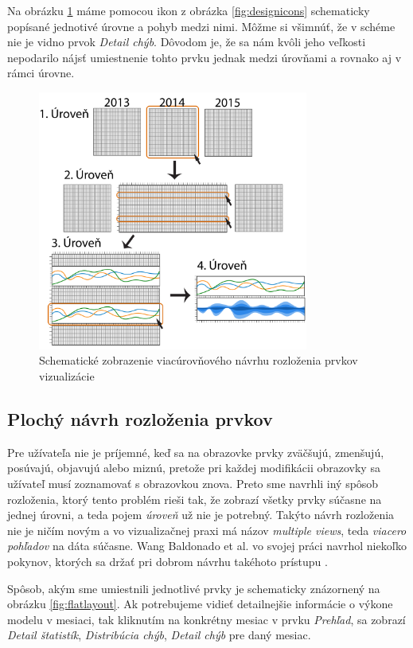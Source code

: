 Na obrázku \ref{fig:multilevellayout} máme pomocou ikon z obrázka \ref{fig:designicons} schematicky popísané jednotivé úrovne a pohyb medzi nimi. Môžme si všimnúť, že v schéme nie je vidno prvok \textit{Detail chýb}. Dôvodom je, že sa nám kvôli jeho veľkosti nepodarilo nájsť umiestnenie tohto prvku jednak medzi úrovňami a rovnako aj v rámci úrovne.

\begin{figure}
	\centering
	\includegraphics[width = 3.5in]{multilevellayout}
	\caption{Schematické zobrazenie viacúrovňového návrhu rozloženia prvkov vizualizácie}
	\label{fig:multilevellayout}
\end{figure}


\subsection{Plochý návrh rozloženia prvkov} %
Pre užívateľa nie je príjemné, keď sa na obrazovke prvky zväčšujú, zmenšujú, posúvajú, objavujú alebo miznú, pretože pri každej modifikácii obrazovky sa užívateľ musí zoznamovať s obrazovkou znova.
Preto sme navrhli iný spôsob rozloženia, ktorý tento problém rieši tak, že zobrazí všetky prvky súčasne na jednej úrovni, a teda pojem \textit{úroveň} už nie je potrebný. Takýto návrh rozloženia nie je ničím novým a vo vizualizačnej praxi má názov \textit{multiple views}, teda \textit{viacero pohľadov} na dáta súčasne. Wang Baldonado et al. vo svojej práci navrhol niekoľko pokynov, ktorých sa držať pri dobrom návrhu takéhoto prístupu \cite{Baldonado}.

Spôsob, akým sme umiestnili jednotlivé prvky je schematicky znázornený na obrázku \ref{fig:flatlayout}. Ak potrebujeme vidieť detailnejšie informácie o výkone modelu v mesiaci, tak kliknutím na konkrétny mesiac v prvku \textit{Prehľad}, sa zobrazí \textit{Detail štatistík}, \textit{Distribúcia chýb}, \textit{Detail chýb} pre daný mesiac.

